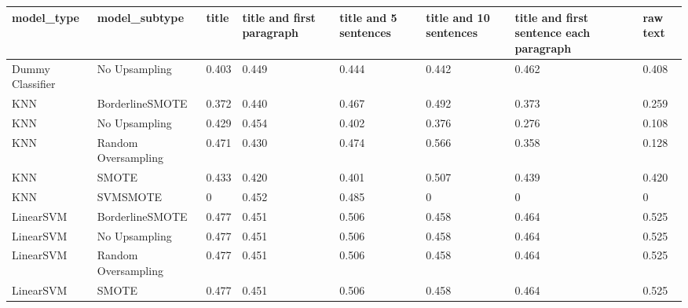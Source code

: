 \begin{tabular}{llllllll}
\toprule
                  model\_type &       model\_subtype & title & title and first paragraph & title and 5 sentences & title and 10 sentences & title and first sentence each paragraph &  raw text \\
\midrule
            Dummy Classifier &       No Upsampling & 0.403 &                     0.449 &                 0.444 &                  0.442 &                                   0.462 &     0.408 \\
                         KNN &     BorderlineSMOTE & 0.372 &                     0.440 &                 0.467 &                  0.492 &                                   0.373 &     0.259 \\
                         KNN &       No Upsampling & 0.429 &                     0.454 &                 0.402 &                  0.376 &                                   0.276 &     0.108 \\
                         KNN & Random Oversampling & 0.471 &                     0.430 &                 0.474 &                  0.566 &                                   0.358 &     0.128 \\
                         KNN &               SMOTE & 0.433 &                     0.420 &                 0.401 &                  0.507 &                                   0.439 &     0.420 \\
                         KNN &            SVMSMOTE &     0 &                     0.452 &                 0.485 &                      0 &                                       0 &         0 \\
                   LinearSVM &     BorderlineSMOTE & 0.477 &                     0.451 &                 0.506 &                  0.458 &                                   0.464 &     0.525 \\
                   LinearSVM &       No Upsampling & 0.477 &                     0.451 &                 0.506 &                  0.458 &                                   0.464 &     0.525 \\
                   LinearSVM & Random Oversampling & 0.477 &                     0.451 &                 0.506 &                  0.458 &                                   0.464 &     0.525 \\
                   LinearSVM &               SMOTE & 0.477 &                     0.451 &                 0.506 &                  0.458 &                                   0.464 &     0.525 \\

\end{tabular}
